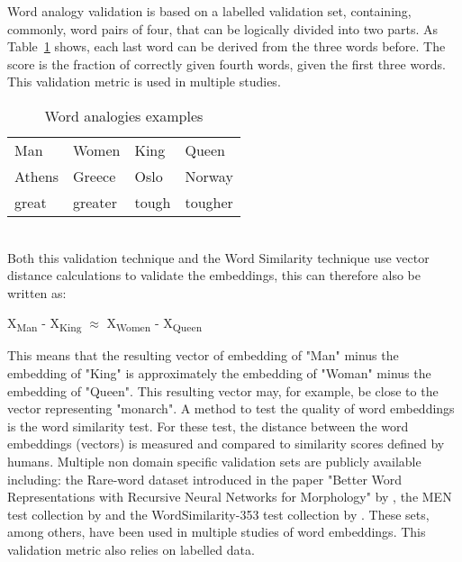 \documentclass[../../Thesis.tex]{subfiles}
\begin{document}
\begin{jumpin}
Word analogy validation is based on a labelled validation set, containing, commonly, word pairs of four, that can be logically divided into two parts. As Table~\ref{table:wordAnalogies} shows, each last word can be derived from the three words before. The score is the fraction of correctly given fourth words, given the first three words. This validation metric is used in multiple studies\cite{mikolov2013distributed, mikolov2013efficient, dai2015document, pennington2014glove}.\\
\begin{table}[hbt]
\begin{center}
\begin{tabular}{l l l l}
Man & Women & King & Queen \\
Athens & Greece & Oslo & Norway\\
great & greater & tough & tougher
\end{tabular}
\end{center}
\caption{Word analogies examples}\label{table:wordAnalogies}
\end{table}\\
Both this validation technique and the Word Similarity technique use vector distance calculations to validate the embeddings, this can therefore also be written as:
\begin{displayquote}
	X\textsubscript{Man} - X\textsubscript{King} $\approx$  X\textsubscript{Women} - X\textsubscript{Queen}
\end{displayquote}
This means that the resulting vector of embedding of "Man" minus the embedding of "King" is approximately the embedding of "Woman" minus the embedding of "Queen". This resulting vector may, for example, be close to the vector representing "monarch".
A method to test the quality of word embeddings is the word similarity test. For these test, the distance between the word embeddings (vectors) is measured and compared to similarity scores defined by humans. Multiple non domain specific validation sets are publicly available including: the Rare-word dataset introduced in the paper "Better Word Representations with Recursive Neural Networks for Morphology" by \citet{luong2013better}, 
the MEN test collection by \citet{EBruniMENCollection} and the WordSimilarity-353 test collection by \citet{EGabrilovichWScollection}.
These sets, among others, have been used in multiple studies of word embeddings\cite{pennington2014glove, mikolov2013efficient}. This validation metric also relies on labelled data.

\end{jumpin}
\end{document}

